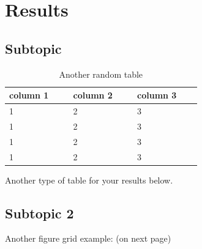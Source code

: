 \section{Results}

\subsection{Subtopic}
\lipsum[2]

\begin{table}[ht]
    \centering
    \begin{tabular}{p{0.25\linewidth}p{0.25\linewidth}p{0.25\linewidth}}
    \hline
    column 1 & column 2 & column 3\\
    \hline
    1 & 2 & 3\\
    1 & 2 & 3\\
    1 & 2 & 3\\
    1 & 2 & 3\\
    \hline
    \end{tabular}
    \caption{Another random table}
    \label{tab:2}
\end{table}
\noindent Another type of table for your results below.

\subsection{Subtopic 2}
\lipsum[1]

\noindent Another figure grid example: (on next page)

